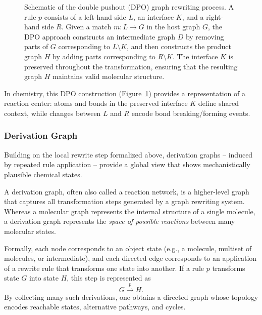 \begin{figure}[H]
    \centering
    \caption[Double pushout graph rewriting]{
        Schematic of the double pushout (DPO) graph rewriting process.
        A rule \(p\) consists of a left-hand side \(L\), an interface \(K\), and a right-hand side \(R\).
        Given a match \(m: L \to G\) in the host graph \(G\), the DPO approach constructs an intermediate graph \(D\) by removing parts of \(G\) corresponding to \(L \setminus K\), and then constructs the product graph \(H\) by adding parts corresponding to \(R \setminus K\).
        The interface \(K\) is preserved throughout the transformation, ensuring that the resulting graph \(H\) maintains valid molecular structure.
    }
    \label{fig:dpo-rewriting}
\end{figure}


In chemistry, this DPO construction (Figure~\ref{fig:dpo-rewriting}) provides a representation of a reaction center: atoms and bonds in the preserved interface \(K\) define shared context, while changes between \(L\) and \(R\) encode bond breaking/forming events. \cite[p.~5]{Andersen2017}

\subsubsection{Derivation Graph}
Building on the local rewrite step formalized above, derivation graphs -- induced by repeated rule application -- provide a global view that shows mechanistically plausible chemical states.
\cite[pp.~2--3]{Andersen2013}

A derivation graph, often also called a reaction network, is a higher-level graph that captures all transformation steps generated by a graph rewriting system.
\cite[Sec.~10]{MODDocDGStrat} \cite[p.~2]{Abel2026}
Whereas a molecular graph represents the internal structure of a single molecule, a derivation graph represents the \emph{space of possible reactions} between many molecular states.
\cite[pp.~2--3]{Andersen2013}

Formally, each node corresponds to an object state (e.g., a molecule, multiset of molecules, or intermediate), and each directed edge corresponds to an application of a rewrite rule that transforms one state into another.
 \cite[p.~75]{Echahed2016}
If a rule $p$ transforms state $G$ into state $H$, this step is represented as
\[
G \stackrel{p}{\longrightarrow} H.
\]
By collecting many such derivations, one obtains a directed graph whose topology encodes reachable states, alternative pathways, and cycles.

